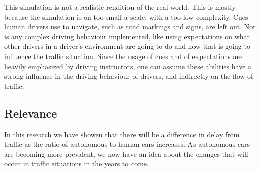 This simulation is not a realistic rendition of the real world. This is mostly because the simulation is on too small a scale, with a too low complexity. Cues human drivers use to navigate, such as road markings and signs, are left out. Nor is any complex driving behaviour implemented, like using expectations on what other drivers in a driver's environment are going to do and how that is going to influence the traffic situation. Since the usage of cues and of expectations are heavily emphasized by driving instructors, one can assume these abilities have a strong influence in the driving behaviour of drivers, and indirectly on the flow of traffic.

\subsection{Relevance}
\label{sub:conclusion:relevance}

In this research we have showen that there will be a difference in delay from traffic as the ratio of autonomous to human cars increases. As autonomous cars are becoming more prevalent, we now have an idea about the changes that will occur in traffic situations in the years to come. 

